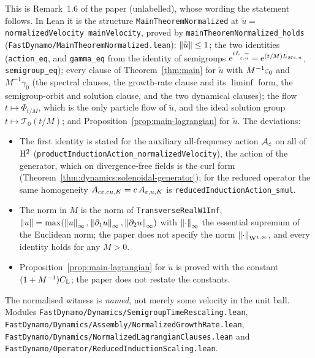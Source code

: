 This is Remark~1.6 of the paper (unlabelled), whose wording the statement follows.  In Lean it
is the structure \texttt{MainTheoremNormalized} at $\widetilde u=$
\texttt{normalizedVelocity mainVelocity}, proved by \texttt{mainTheoremNormalized\_holds}
(\texttt{FastDynamo/MainTheoremNormalized.lean}): $\left\|\widetilde u\right\|\leq1$; the two
identities (\texttt{action\_eq}, and \texttt{gamma\_eq} from the identity of semigroups
$\mathrm{e}^{tL_{\varepsilon,\widetilde u}}=\mathrm{e}^{(t/M)L_{M\varepsilon,u}}$, \texttt{semigroup\_eq}); every clause of
Theorem~\ref{thm:main} for $\widetilde u$ with $M^{-1}\varepsilon_0$ and $M^{-1}\gamma_0$ (the spectral
clauses, the growth-rate clause and its $\liminf$ form, the semigroup-orbit and solution
clause, and the two dynamical clauses); the flow $t\mapsto\Phi_{t/M}$, which is the only
particle flow of $\widetilde u$, and the ideal solution group $t\mapsto\mathcal T_0(t/M)$; and
Proposition~\ref{prop:main-lagrangian} for $\widetilde u$.  The deviations:
\begin{itemize}
  \item The first identity is stated for the auxiliary all-frequency action $\mathcal A_\varepsilon$
    on all of $\mathrm{H}^2$ (\texttt{productInductionAction\_normalizedVelocity}), the action of the
    generator, which on divergence-free fields is the curl form
    (Theorem~\ref{thm:dynamics:solenoidal-generator}); for the reduced operator the same
    homogeneity $A_{c\varepsilon,cu,K}=c\,A_{\varepsilon,u,K}$ is \texttt{reducedInductionAction\_smul}.
  \item The norm in $M$ is the norm of \texttt{TransverseRealW1Inf},
    $\left\|u\right\|=\max(\left\|u\right\|_\infty,\left\|\partial_1u\right\|_\infty,\left\|\partial_2u\right\|_\infty)$ with
    $\left\|\cdot\right\|_\infty$ the essential supremum of the Euclidean norm; the paper does not
    specify the norm $\left\|\cdot\right\|_{\mathrm{W}^{1,\infty}}$, and every identity holds for any $M>0$.
  \item Proposition~\ref{prop:main-lagrangian} for $\widetilde u$ is proved with the constant
    $(1+M^{-1})C_{\rm L}$; the paper does not restate the constants.
\end{itemize}
The normalised witness is \emph{named}, not merely some velocity in the unit ball.  Modules
\texttt{FastDynamo/Dynamics/SemigroupTimeRescaling.lean},
\texttt{FastDynamo/Dynamics/Assembly/NormalizedGrowthRate.lean},
\texttt{FastDynamo/Dynamics/NormalizedLagrangianClauses.lean} and
\texttt{FastDynamo/Operator/ReducedInductionScaling.lean}.

